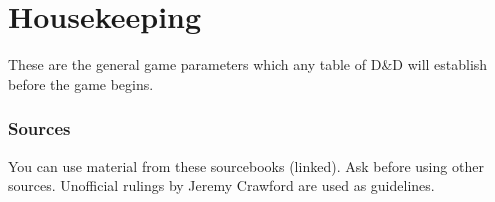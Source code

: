 \documentclass[letterpaper,twocolumn,openany,nodeprecatedcode]{dndbook}
\begin{document}
\tableofcontents

%


\chapter{Housekeeping}

These are the general game parameters which any table of D\&D will establish before the game begins.

\subsection{Sources}
You can use material from these sourcebooks (linked). Ask before using other sources. Unofficial rulings by Jeremy Crawford are used as guidelines.
\end{document}
